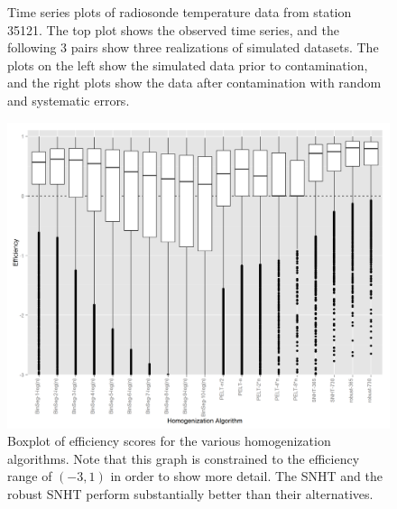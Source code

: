 \documentclass[12pt]{article}
\begin{document}
\begin{figure}
	\caption{Time series plots of radiosonde temperature data from station 35121.  The top plot shows the observed time series, and the following 3 pairs show three realizations of simulated datasets.  The plots on the left show the simulated data prior to contamination, and the right plots show the data after contamination with random and systematic errors.}
	\label{fig:simExample}
\end{figure}

\begin{figure}[h!]
	\centering
	\includegraphics[width=\textwidth]{homogenization_efficiency_boxplots}
	\caption{Boxplot of efficiency scores for the various homogenization algorithms.  Note that this graph is constrained to the efficiency range of $(-3,1)$ in order to show more detail.  The SNHT and the robust SNHT perform substantially  better than their alternatives.}
	\label{fig:homEfficiency}
\end{figure}
\end{document}
